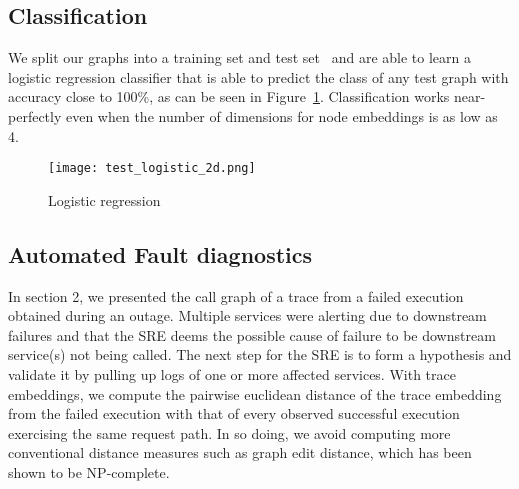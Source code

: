 

\subsection{Classification}
We split our graphs into a training set and test set~ and are able to learn a logistic regression classifier that is able to predict the class of any test graph with accuracy close to 100\%, as can be seen in Figure~\ref{Classification}. Classification works near-perfectly even when the number of dimensions for node embeddings is as low as 4.

\begin{figure}
\texttt{[image: test\_logistic\_2d.png]}
\caption{Logistic regression}
\label{Classification}
\end{figure}

\newline
{}

\subsection{Automated Fault diagnostics}
In section 2, we presented the call graph of a trace from a failed execution obtained during an outage. Multiple services were alerting due to downstream failures and that the SRE deems the possible cause of failure to be downstream service(s) not being called. The next step for the SRE is to form a hypothesis and validate it by pulling up logs of one or more affected services. With trace embeddings, we compute the pairwise euclidean distance of the trace embedding from the failed execution with that of every observed successful execution exercising the same request path. In so doing, we avoid computing more conventional distance measures such as graph edit distance, which has been shown to be NP-complete. 

